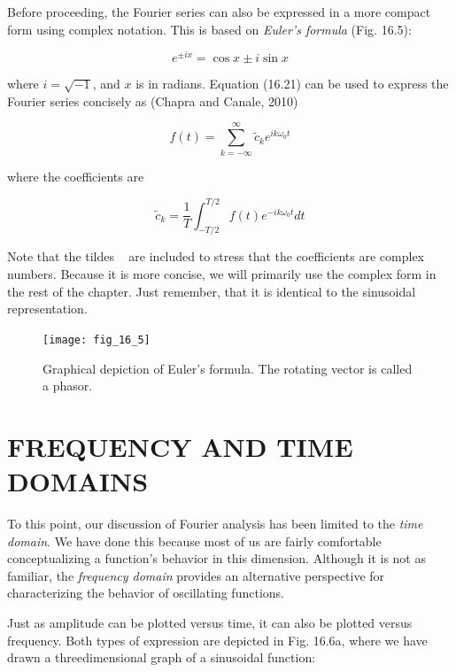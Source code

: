\documentclass[../main.tex]{subfiles}
\begin{document}
Before proceeding, the Fourier series can also be expressed in a more compact form
using complex notation. This is based on \textit{Euler's formula} (Fig. 16.5):

\begin{equation}
	\tag{16.21}
	e^{\pm ix} = \cos x \pm  i \sin x
\end{equation}

\noindent where $i = \sqrt{-1}$, and $x$ is in radians. Equation (16.21) can be used to express the Fourier
series concisely as (Chapra and Canale, 2010)

\begin{equation}
	\tag{16.22}
	f(t) = \sum _ {k=-\infty} ^ {\infty} \tilde{c}_k e^{i k \omega_0 t} 
\end{equation}

\noindent where the coefficients are

\begin{equation}
	\tag{16.23}
	\tilde{c}_k = \frac{1}{T} \int ^ {T/2} _ {-T/2} f(t) e ^ {-ik \omega_0 t} dt
\end{equation}

Note that the tildes ~ are included to stress that the coefficients are complex numbers.
Because it is more concise, we will primarily use the complex form in the rest of the
chapter. Just remember, that it is identical to the sinusoidal representation.

\begin{figure}[H] %
	\centering
	\texttt{[image: fig\_16\_5]}
	\caption{\textsf{Graphical depiction of Euler's formula. The rotating vector is called a phasor.}}
	\label{fig:fig_16_5}
\end{figure}

\label{cha:cha_P_16_3} %
\section{FREQUENCY AND TIME DOMAINS}

\noindent To this point, our discussion of Fourier analysis has been limited to the \textit{time domain}. We
have done this because most of us are fairly comfortable conceptualizing a function's
behavior in this dimension. Although it is not as familiar, the \textit{frequency domain} provides an
alternative perspective for characterizing the behavior of oscillating functions.

Just as amplitude can be plotted versus time, it can also be plotted versus frequency.
Both types of expression are depicted in Fig. 16.6a, where we have drawn a threedimensional graph of a sinusoidal function:
\end{document}
